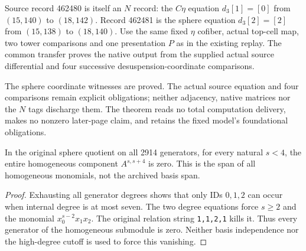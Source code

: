 \begin{proposition}
  \label{prop:lin-native-naturality-462481}
  \notready
  Source record 462480 is itself an $N$ record: the $C\eta$ equation
  $d_3[1]=[0]$ from $(15,140)$ to $(18,142)$.
  Record 462481 is the sphere equation $d_3[2]=[2]$ from $(15,138)$
  to $(18,140)$. Use the same fixed $\eta$ cofiber, actual top-cell map,
  two tower comparisons and one presentation $P$ as in the existing replay.
  The common transfer proves the native output from the supplied actual
  source differential and four successive desuspension-coordinate comparisons.

  The sphere coordinate witnesses are proved. The actual source equation
  and four comparisons remain explicit obligations; neither adjacency,
  native matrices nor the $N$ tags discharge them. The theorem reads no
  total computation delivery, makes no nonzero later-page claim, and
  retains the fixed model's foundational obligations.
\end{proposition}

\begin{lemma}
  \label{lem:lin-stem-four-low}
  \leanok
  In the original sphere quotient on all 2914 generators, for every
  natural $s<4$, the entire homogeneous component $A^{s,s+4}$ is zero.
  This is the span of all homogeneous monomials, not the archived basis span.
\end{lemma}
\begin{proof}
  \leanok
  Exhausting all generator degrees shows that only IDs $0,1,2$ can
  occur when internal degree is at most seven. The two degree equations
  force $s\ge2$ and the monomial $x_0^{s-2}x_1x_2$.
  The original relation string \texttt{1,1,2,1} kills it. Thus every
  generator of the homogeneous submodule is zero. Neither basis
  independence nor the high-degree cutoff is used to force this vanishing.
\end{proof}

